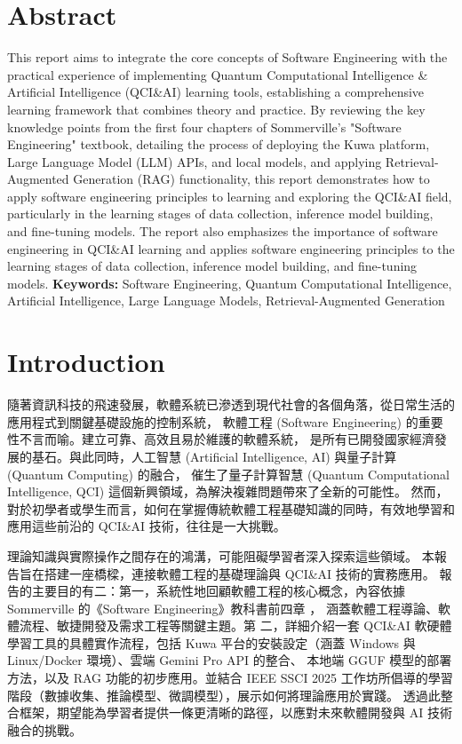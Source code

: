 \documentclass[twocolumn,11pt,a4paper]{article}
\begin{document}
\section*{Abstract}
This report aims to integrate the core concepts of Software Engineering with the practical experience of 
implementing Quantum Computational Intelligence \& Artificial Intelligence (QCI\&AI) learning tools, 
establishing a comprehensive learning framework that combines theory and practice. 
By reviewing the key knowledge points from the first four chapters of Sommerville's "Software Engineering" 
textbook, detailing the process of deploying the Kuwa platform, Large Language Model (LLM) APIs,
and local models, and applying Retrieval-Augmented Generation (RAG) functionality, 
this report demonstrates how to apply software engineering principles to learning and exploring the QCI\&AI field, 
particularly in the learning stages of data collection, inference model building, and fine-tuning models. 
The report also emphasizes the importance of software engineering in QCI\&AI learning and 
applies software engineering principles to the learning stages of data collection, 
inference model building, and fine-tuning models.
\linebreak \linebreak
\noindent \textbf{Keywords:} Software Engineering, Quantum Computational Intelligence, Artificial Intelligence, Large Language Models, Retrieval-Augmented Generation


\section{Introduction}
隨著資訊科技的飛速發展，軟體系統已滲透到現代社會的各個角落，從日常生活的應用程式到關鍵基礎設施的控制系統，
軟體工程 (Software Engineering) 的重要性不言而喻。建立可靠、高效且易於維護的軟體系統，
是所有已開發國家經濟發展的基石。與此同時，人工智慧 (Artificial Intelligence, AI) 與量子計算 (Quantum Computing) 的融合，
催生了量子計算智慧 (Quantum Computational Intelligence, QCI) 這個新興領域，為解決複雜問題帶來了全新的可能性。
然而，對於初學者或學生而言，如何在掌握傳統軟體工程基礎知識的同時，有效地學習和應用這些前沿的 QCI\&AI 技術，往往是一大挑戰。

理論知識與實際操作之間存在的鴻溝，可能阻礙學習者深入探索這些領域。
本報告旨在搭建一座橋樑，連接軟體工程的基礎理論與 QCI\&AI 技術的實務應用。
報告的主要目的有二：第一，系統性地回顧軟體工程的核心概念，內容依據 Sommerville 的《Software Engineering》教科書前四章 \cite{sommerville2015}，
涵蓋軟體工程導論、軟體流程、敏捷開發及需求工程等關鍵主題。第
二，詳細介紹一套 QCI\&AI 軟硬體學習工具的具體實作流程，包括 Kuwa 平台的安裝設定（涵蓋 Windows 與 Linux/Docker 環境）、雲端 Gemini Pro API 的整合、
本地端 GGUF 模型的部署方法，以及 RAG 功能的初步應用。並結合 IEEE SSCI 2025 工作坊所倡導的學習階段（數據收集、推論模型、微調模型），展示如何將理論應用於實踐。
透過此整合框架，期望能為學習者提供一條更清晰的路徑，以應對未來軟體開發與 AI 技術融合的挑戰。
\end{document}
